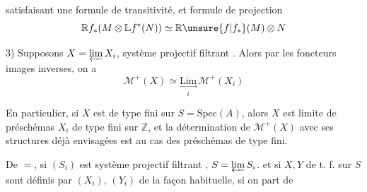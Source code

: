 satisfaisant une formule de transitivité, %
et formule de projection %
\[
\mathbb R f_*(M\otimes\mathbb L f^*(N))\simeq\mathbb R \unsure{f|f_*}(M)\otimes N %
\]

3) Supposons $X=\varprojlim X_i$, système projectif %
filtrant . Alors par les foncteurs %
images inverses, on a %
\[
\mathcal M^+(X)\simeq\underset{i}{\underset{\longrightarrow}{\mathrm{Lim}}}\,\mathcal M^+(X_i) %
\]

En particulier, si $X$ est de type fini %
sur $S=\mathrm{Spec}(A)$, alors $X$ est limite de %
préschémas $X_i$ de type fini sur $\mathbb Z$, et %
la détermination de $\mathcal M^+(X)$ avec ses %
structures déjà envisagées est   %
au cas des préschémas de type fini. %

De $=$, si $(S_i)$ est système %
projectif filtrant , $S=\varprojlim S_i$. %
et si $X,Y$ de t. f. sur $S$ sont %
définis par $(X_i)$, $(Y_i)$ de la %
façon habituelle, si on part de %


